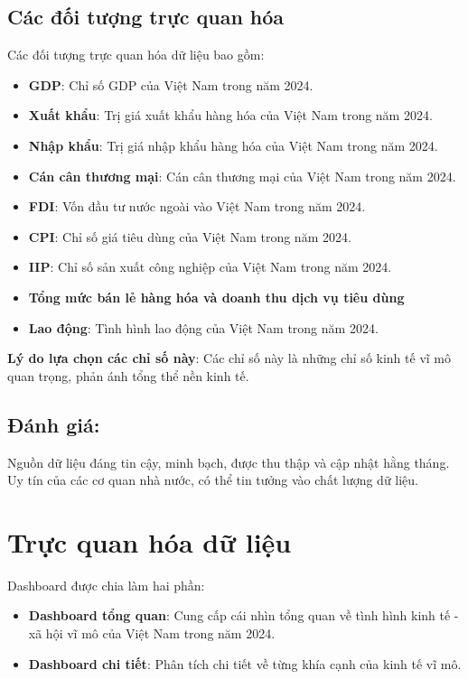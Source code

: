 \documentclass[a4paper]{report}
\begin{document}
{{\subsection{Các đối tượng trực quan hóa}
Các đối tượng trực quan hóa dữ liệu bao gồm:
\begin{itemize}
    \item \textbf{GDP}: Chỉ số GDP của Việt Nam trong năm 2024.
    \item \textbf{Xuất khẩu}: Trị giá xuất khẩu hàng hóa của Việt Nam trong năm 2024.
    \item \textbf{Nhập khẩu}: Trị giá nhập khẩu hàng hóa của Việt Nam trong năm 2024.
    \item \textbf{Cán cân thương mại}: Cán cân thương mại của Việt Nam trong năm 2024.
    \item \textbf{FDI}: Vốn đầu tư nước ngoài vào Việt Nam trong năm 2024.
    \item \textbf{CPI}: Chỉ số giá tiêu dùng của Việt Nam trong năm 2024.
    \item \textbf{IIP}: Chỉ số sản xuất công nghiệp của Việt Nam trong năm 2024.
    \item \textbf{Tổng mức bán lẻ hàng hóa và doanh thu dịch vụ tiêu dùng}
    \item \textbf{Lao động}: Tình hình lao động của Việt Nam trong năm 2024.
\end{itemize}

\textbf{Lý do lựa chọn các chỉ số này}: Các chỉ số này là những chỉ số kinh tế vĩ mô quan trọng, phản ánh tổng thể nền kinh tế.

\subsection{Đánh giá:}

Nguồn dữ liệu đáng tin cậy, minh bạch, được thu thập và cập nhật hằng tháng. Uy tín của các cơ quan nhà nước, có thể tin tưởng vào chất lượng dữ liệu.


\newpage
\section{Trực quan hóa dữ liệu}
Dashboard được chia làm hai phần:
\begin{itemize}
    \item \textbf{Dashboard tổng quan}: Cung cấp cái nhìn tổng quan về tình hình kinh tế - xã hội vĩ mô của Việt Nam trong năm 2024.
    \item \textbf{Dashboard chi tiết}: Phân tích chi tiết về từng khía cạnh của kinh tế vĩ mô.
\end{itemize}


}}
\end{document}
